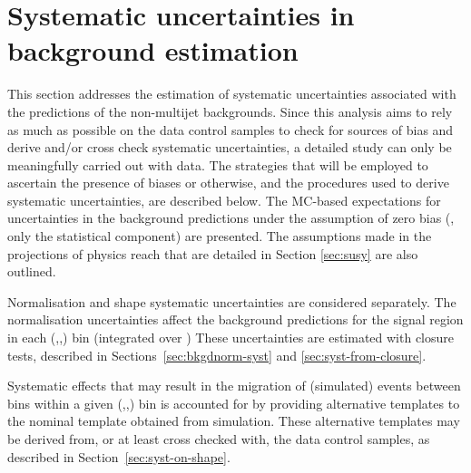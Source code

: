 \section{Systematic uncertainties in background estimation}
\label{sec:systematics}

This section addresses the estimation of systematic uncertainties
associated with the predictions of the non-multijet backgrounds. Since
this analysis aims to rely as much as possible on the data control
samples to check for sources of bias and derive and/or cross check
systematic uncertainties, a detailed study can only be meaningfully
carried out with data. The strategies that will be employed to
ascertain the presence of biases or otherwise, and the procedures used
to derive systematic uncertainties, are described below. The MC-based
expectations for uncertainties in the background predictions under the
assumption of zero bias (\ie, only the statistical component) are
presented. The assumptions made in the projections of physics reach
that are detailed in Section \ref{sec:susy} are also outlined.

Normalisation and shape systematic uncertainties are considered
separately. The normalisation uncertainties affect the background
predictions for the signal region in each (\nb,\njet,\HT) bin
(integrated over \mht) These uncertainties are estimated with closure
tests, described in Sections~\ref{sec:bkgdnorm-syst} and
\ref{sec:syst-from-closure}. 

Systematic effects that may result in the migration of (simulated)
events between \mht bins within a given (\njet,\nb,\HT) bin is
accounted for by providing alternative templates to the nominal \mht
template obtained from simulation. These alternative \mht templates
may be derived from, or at least cross checked with, the data control
samples, as described in Section~\ref{sec:syst-on-shape}.

%

